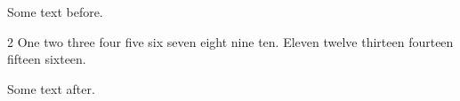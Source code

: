 \documentclass{article}
\begin{document}
\makeatletter
Some text before.
\begin{multicols}{2}
One two three four five six seven eight nine ten.
Eleven twelve thirteen fourteen fifteen sixteen.
\end{multicols}
Some text after.
\end{document}
